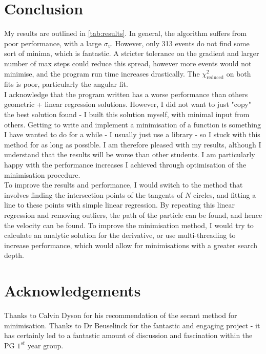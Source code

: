 \documentclass[11pt]{article}
\begin{document}
\section{Conclusion}
\label{sec:conclusion}
My results are outlined in \autoref{tab:results}. In general, the algorithm suffers from poor performance, with a large $\sigma_v$.  However, only 313 events do not find some sort of minima, which is fantastic. A stricter tolerance on the gradient and larger number of max steps could reduce this spread, however more events would not minimise, and the program run time increases drastically. The $\chi^2_\text{reduced}$ on both fits is poor, particularly the angular fit.\\

I acknowledge that the program written has a worse performance than others geometric + linear regression solutions. However, I did not want to just "copy" the best solution found - I built this solution myself, with minimal input from others. Getting to write and implement a minimisation of a function is something I have wanted to do for a while - I usually just use a library - so I stuck with this method for as long as possible. I am therefore pleased with my results, although I understand that the results will be worse than other students. I am particularly happy with the performance increases I achieved through optimisation of the minimisation procedure.\\

To improve the results and performance, I would switch to the method that involves finding the intersection points of the tangents of $N$ circles, and fitting a line to these points with simple linear regression. By repeating this linear regression and removing outliers, the path of the particle can be found, and hence the velocity can be found. To improve the minimisation method, I would try to calculate an analytic solution for the derivative, or use multi-threading to increase performance, which would allow for minimisations with a greater search depth.

\section{Acknowledgements}
\label{sec:acknowledgements}
Thanks to Calvin Dyson for his recommendation of the secant method for minimisation. Thanks to Dr Beuselinck for the fantastic and engaging project - it has certainly led to a fantastic amount of discussion and fascination within the PG $1^{st}$ year group.
\end{document}
